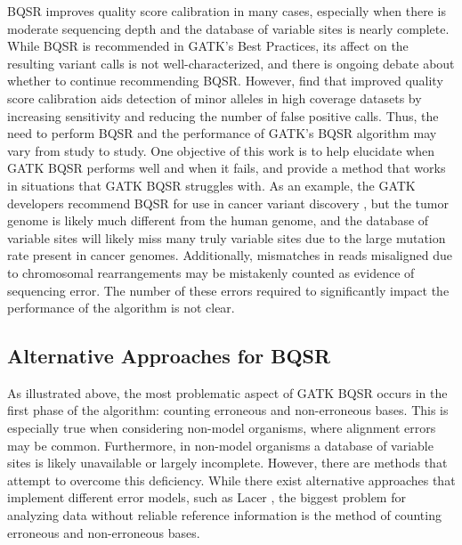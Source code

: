 BQSR improves quality score calibration in many cases, especially when there is moderate sequencing depth and the database of variable sites is nearly complete. %
While BQSR is recommended in GATK's Best Practices, its affect on the resulting variant calls is not well-characterized, and there is ongoing debate about whether to continue recommending BQSR. \parencite{van_der_auwera_geraldine_2020} %
However, \cite{ni_improvement_2016} find that improved quality score calibration aids detection of minor alleles in high coverage datasets by increasing sensitivity and reducing the number of false positive calls.
Thus, the need to perform BQSR and the performance of GATK's BQSR algorithm may vary from study to study.
One objective of this work is to help elucidate when GATK BQSR performs well and when it fails, and provide a method that works in situations that GATK BQSR struggles with.
As an example, the GATK developers recommend BQSR for use in cancer variant discovery \parencite{cibulskis_sensitive_2013}, but the tumor genome is likely much different from the human genome, and the database of variable sites will likely miss many truly variable sites due to the large mutation rate present in cancer genomes. Additionally, mismatches in reads misaligned due to chromosomal rearrangements may be mistakenly counted as evidence of sequencing error. The number of these errors required to significantly impact the performance of the algorithm is not clear.

\subsection{Alternative Approaches for BQSR}
As illustrated above, the most problematic aspect of GATK BQSR occurs in the first phase of the algorithm: counting erroneous and non-erroneous bases. This is especially true when considering non-model organisms, where alignment errors may be common. Furthermore, in non-model organisms a database of variable sites is likely unavailable or largely incomplete. However, there are methods that attempt to overcome this deficiency. While there exist alternative approaches that implement different error models, such as Lacer \parencite{chung_lacer:_2017}, the biggest problem for analyzing data without reliable reference information is the method of counting erroneous and non-erroneous bases.

